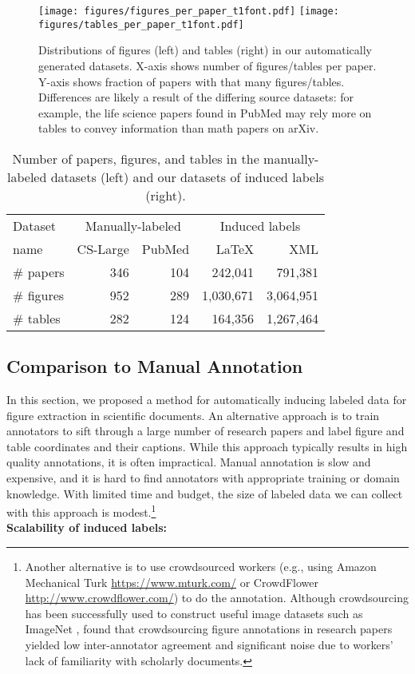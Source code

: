 \documentclass[sigconf]{acmart}
\begin{document}
\begin{figure*}
\texttt{[image: figures/figures\_per\_paper\_t1font.pdf]}
\texttt{[image: figures/tables\_per\_paper\_t1font.pdf]}
\caption{Distributions of figures (left) and tables (right) in our automatically generated datasets. X-axis shows number of figures/tables per paper. Y-axis shows fraction of papers with that many figures/tables. Differences are likely a result of the differing source datasets: for example, the life science papers found in PubMed may rely more on tables to convey information than math papers on arXiv.
}
\label{fig:histogram}
\end{figure*}\begin{table}[t]
\begin{center}
\begin{tabular}{|l|rr|rr|} \hline
Dataset        & \multicolumn{2}{c|}{Manually-labeled} & \multicolumn{2}{c|}{Induced labels} \\
name & CS-Large \cite{pdffigures2} & PubMed & LaTeX & XML \\ \hline 
\# papers & 346   & 104      & 242,041 & 791,381   \\ 
\# figures & 952   & 289      & 1,030,671     & 3,064,951   \\ 
\# tables  & 282   & 124      & 164,356     & 1,267,464  \\ \hline
\end{tabular}
\vspace{0.2cm}
\caption{Number of papers, figures, and tables in the manually-labeled datasets (left) and our datasets of induced labels (right).}\label{tab:dataset_stats}
\end{center}
\end{table}\subsection{Comparison to Manual Annotation}\label{sec:dataset_stats}
In this section, we proposed a method for automatically inducing labeled data for figure extraction in scientific documents.
An alternative approach is to train annotators to sift through a large number of research papers and label figure and table coordinates and their captions.
While this approach typically results in high quality annotations, it is often impractical.
Manual annotation is slow and expensive, and it is hard to find annotators with appropriate training or domain knowledge.
With limited time and budget, the size of labeled data we can collect with this approach is modest.\footnote{Another alternative is to use crowdsourced workers (e.g., using Amazon Mechanical Turk \url{https://www.mturk.com/} or CrowdFlower \url{http://www.crowdflower.com/}) to do the annotation.
Although crowdsourcing has been successfully used to construct useful image datasets such as ImageNet \cite{ImageNet}, \cite{figureseer} found that crowdsourcing figure annotations in research papers yielded low inter-annotator agreement and significant noise due to workers' lack of familiarity with scholarly documents.}
\\[15pt]\textbf{Scalability of induced labels:}
\end{document}
